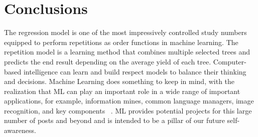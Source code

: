 \documentclass[10pt]{aa}
\begin{document}

\section{Conclusions}
The regression model is one of the most impressively controlled study numbers equipped to perform repetitions as order functions in machine learning. The repetition model is a learning method that combines multiple selected trees and predicts the end result depending on the average yield of each tree. Computer-based intelligence can learn and build respect models to balance their thinking and decisions. Machine Learning does something to keep in mind, with the realization that ML can play an important role in a wide range of important applications, for example, information mines, common language managers, image recognition, and key components ~\cite{gijsbers_2019_gama}. ML provides potential projects for this large number of posts and beyond and is intended to be a pillar of our future self-awareness.

\centering


\end{document}
